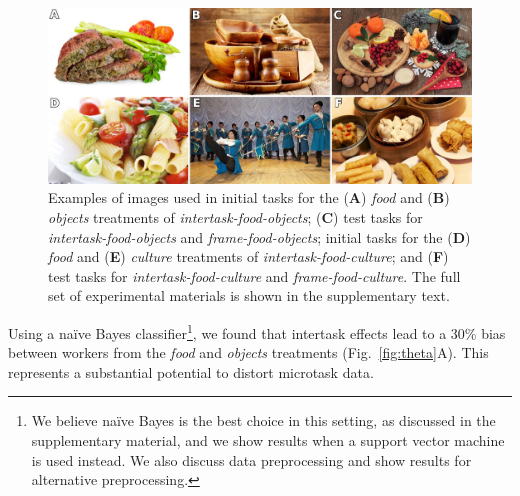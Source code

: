 \documentclass[12pt]{article}
\begin{document}
\begin{figure}
	\centering
	\includegraphics[scale=1.0]{figs/images.jpg}
	\caption{
		Examples of images used in
		initial tasks for the (\textbf{A}) \textit{food} and (\textbf{B}) 
		\textit{objects} treatments of \textit{intertask-food-objects};
		(\textbf{C}) test tasks for \textit{intertask-food-objects} and 
		\textit{frame-food-objects};
		initial tasks for the (\textbf{D}) \textit{food} and (\textbf{E}) 
		\textit{culture} treatments of \textit{intertask-food-culture};
		and (\textbf{F}) test tasks for \textit{intertask-food-culture} and 
		\textit{frame-food-culture}.
		The full set of experimental materials is shown in the 
		supplementary text.
	}

	\label{fig:task}
\end{figure}

Using a na\"ive Bayes classifier\footnote{
	We believe na\"ive Bayes is the best choice in this setting, as discussed
	in the supplementary material, and we show results when a support vector
	machine is used instead. 
	We also discuss data preprocessing and show results for alternative 
	preprocessing.
}, we found that intertask effects 
lead to a 30\% bias between workers from the \textit{food} and 
\textit{objects} treatments (Fig.~\ref{fig:theta}A).  
This represents a substantial potential to distort microtask data.
\end{document}
